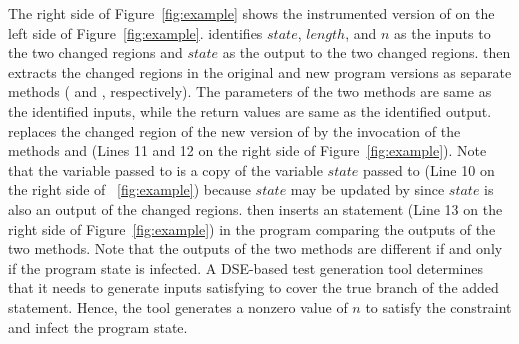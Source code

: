 The right side of Figure~\ref{fig:example} shows the instrumented version of  on the left side of 
Figure~\ref{fig:example}. 
 identifies $state$, $length$, and $n$ as the inputs to the two changed regions
and $state$ as the output to the two changed regions.
 then extracts the
changed regions in the original and new program versions as separate methods 
( and , respectively).
The parameters of the two methods are same as the identified inputs, while the return values 
are same as the identified output.
 replaces the changed region of the new version of
 by the invocation of the methods  and  
(Lines 11 and 12 on the right side of Figure~\ref{fig:example}). 
Note that the variable  passed to 
 is a copy of the variable $state$ passed to  (Line 10 on the right side of ~\ref{fig:example}) because 
$state$ may be updated by  since $state$ is also an output of the changed regions. 
 then inserts an  statement (Line 13 on the right side of Figure~\ref{fig:example})
in the program comparing the outputs of the two methods.
Note that the outputs of the two methods are different if and only if the program state is infected.
A DSE-based test generation tool determines that it needs to generate inputs 
satisfying  to cover the true branch of the added  statement. 
Hence, the tool generates a nonzero value of $n$ to satisfy the constraint and infect the program state. 
